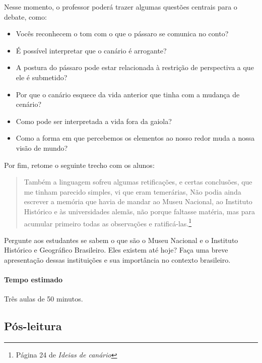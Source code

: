 \documentclass[11pt]{extarticle}
\begin{document}
Nesse momento, o professor poderá trazer algumas questões centrais para o debate, como:

\begin{itemize}

\item Vocês reconhecem o tom com o que o pássaro se comunica no conto? 

\item É possível interpretar que o canário é arrogante? 

\item A postura do pássaro pode estar relacionada à restrição de perspectiva a que ele é submetido?

\item Por que o canário esquece da vida anterior que tinha com a mudança de cenário?

\item Como pode ser interpretada a vida fora da gaiola?

\item Como a forma em que percebemos os elementos ao nosso redor muda a nossa visão de mundo?

\end{itemize}

Por fim, retome o seguinte trecho com os alunos:

\begin{quote}Também a linguagem sofreu algumas retificações, e certas conclusões, que me tinham parecido simples, vi que eram temerárias, Não podia ainda escrever a memória que havia de mandar ao Museu Nacional, ao Instituto Histórico e às universidades alemãs, não porque faltasse matéria, mas para acumular primeiro todas as observações e ratificá-las.\footnote{Página 24 de \textit{Ideias de canário}}\end{quote} 


Pergunte aos estudantes se sabem o que são o Museu Nacional e o Instituto Histórico e Geográfico Brasileiro. Eles existem até hoje? Faça uma breve apresentação dessas instituições e sua importância no contexto brasileiro.

\paragraph{Tempo estimado} Três aulas de 50 minutos.

\subsection{Pós-leitura}
\end{document}
